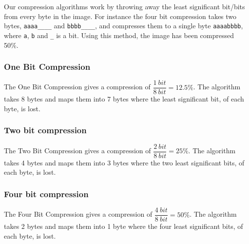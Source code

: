 Our compression algorithms work by throwing away the least significant bit/bits from every byte in the image.
For instance the four bit compression takes two bytes, \texttt{aaaa\_\_\_\_} and \texttt{bbbb\_\_\_\_}, and compresses them to a single byte \texttt{aaaabbbb}, where \texttt{a}, \texttt{b} and \texttt{\_} is a bit. Using this method, the image has been compressed 50\%.


\subsubsection{One Bit Compression} %
\label{sub:one_bit_compression}

The One Bit Compression gives a compression of $\dfrac{1\ bit}{8\ bit} = 12.5\%$.
The algorithm takes 8 bytes and maps them into 7 bytes where the least significant bit, of each byte, is lost.

\subsubsection{Two bit compression} %
\label{sub:two_bit_compression}

The Two Bit Compression gives a compression of $\dfrac{2\ bit}{8\ bit} = 25\%$.
The algorithm takes 4 bytes and maps them into 3 bytes where the two least significant bits, of each byte, is lost.

\subsubsection{Four bit compression} %
\label{sub:four_bit_compression}

The Four Bit Compression gives a compression of $\dfrac{4\ bit}{8\ bit} = 50\%$.
The algorithm takes 2 bytes and maps them into 1 byte where the four least significant bits, of each byte, is lost.
